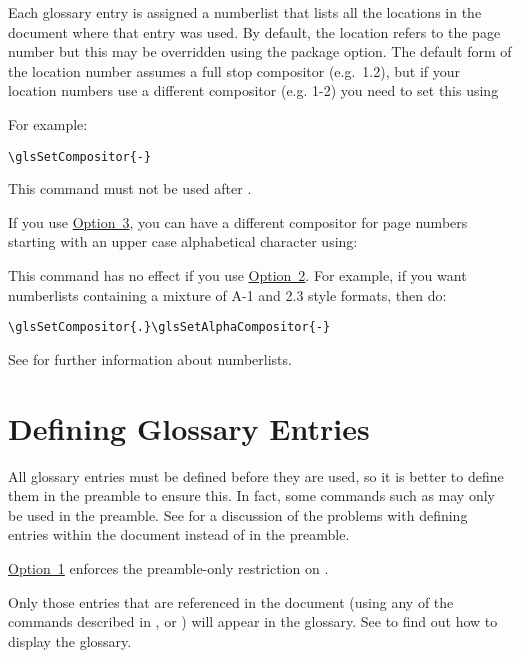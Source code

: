 \documentclass[report,inlinetitle]{nlctdoc}
\newcommand*{\opt}[1]{\hyperlink{option#1}{Option~#1}}
\begin{document}
Each glossary entry is assigned a \gls{numberlist} that lists all 
the locations in the document where that entry was used. By default,
the location refers to the page number but this may be overridden
using the  package option. The default form of
the location number assumes a full stop compositor (e.g.\ 1.2),
but if your location numbers use a different compositor (e.g. 1-2)
you need to set this using
\begin{definition}[\DescribeMacro{\glsSetCompositor}]
\end{definition}
For example:
\begin{verbatim}
\glsSetCompositor{-}
\end{verbatim}
This command must not be used after .

If you use \opt3, you can have a different compositor for page
numbers starting with an upper case alphabetical character using:
\begin{definition}[\DescribeMacro{\glsSetAlphaCompositor}]
\end{definition}
This command has no effect if you use \opt2. For example, if you want 
\glspl{numberlist} containing a mixture of A-1 and 2.3 style
formats, then do:
\begin{verbatim}
\glsSetCompositor{.}\glsSetAlphaCompositor{-}
\end{verbatim}
See  for further information about
\glspl{numberlist}.

\chapter{Defining Glossary Entries}
\label{sec:newglosentry}

All glossary entries must be defined before they are used, so it is
better to define them in the preamble to ensure this. In fact, some
commands such as 
may only be used in the preamble. See  for
a discussion of the problems with defining entries within the
document instead of in the preamble.
\begin{important}
\opt1 enforces the preamble-only restriction on
.
\end{important}

Only those entries that are referenced in the document 
(using any of the commands described in
,  or
) will appear in the glossary. See
 to find out how to display the
glossary.
\end{document}
